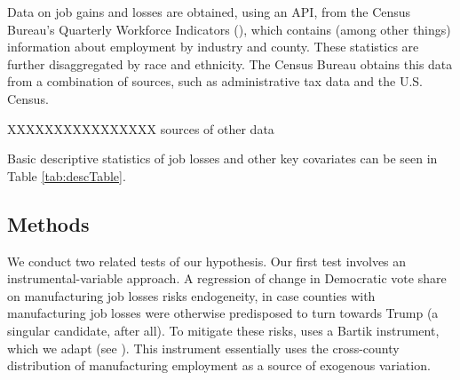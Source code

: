 \documentclass[]{AEA}
\begin{document}
Data on job gains and losses are obtained, using an API, from the Census
Bureau's Quarterly Workforce Indicators (\cite{QWI}), which contains
(among other things) information about employment by industry and
county. These statistics are further disaggregated by race and
ethnicity. The Census Bureau obtains this data from a combination of
sources, such as administrative tax data and the U.S. Census.

XXXXXXXXXXXXXXXX sources of other data

Basic descriptive statistics of job losses and other key covariates can
be seen in Table \ref{tab:descTable}.

\begin{table}[!h]

\caption{\label{tab:descTable}Manufacturing Job Changes 2004-2015}
\centering
{}
\end{table}

\subsection{Methods} 
\label{methodssec}

We conduct two related tests of our hypothesis. Our first test involves
an instrumental-variable approach. A regression of change in Democratic
vote share on manufacturing job losses risks endogeneity, in case
counties with manufacturing job losses were otherwise predisposed to
turn towards Trump (a singular candidate, after all). To mitigate these
risks, \cite{Baccini21} uses a Bartik instrument, which we adapt (see
\cite{Bartik91}). This instrument essentially uses the cross-county
distribution of manufacturing employment as a source of exogenous
variation.
\end{document}
